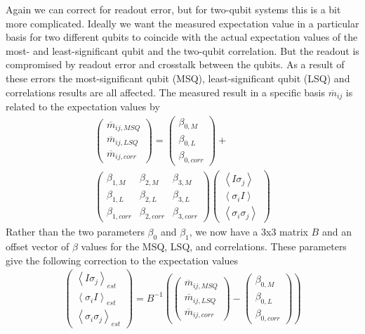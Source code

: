 Again we can correct for readout error, but for two-qubit systems this is a bit
more complicated. Ideally we want the measured expectation value in a particular
basis for two different qubits to coincide with the actual expectation values of
the most- and least-significant qubit and the two-qubit correlation. But the
readout is compromised by readout error and crosstalk between the qubits. As a
result of these errors the most-significant qubit (MSQ), least-significant qubit
(LSQ) and correlations results are all affected. The measured result
in a specific basis $\overline{m}_{ij}$ is related to the expectation values by
\begin{equation}
\label{beta}
\begin{split}
\begin{pmatrix} \overline{m}_{ij,MSQ} \\ \overline{m}_{ij,LSQ} \\
\overline{m}_{ij,corr}
\end{pmatrix}=\begin{pmatrix} \beta_{0,M} \\ \beta_{0,L} \\ \beta_{0,corr}
\end{pmatrix}+\\\begin{pmatrix} \beta_{1,M}&\beta_{2,M}&\beta_{3,M} \\
\beta_{1,L}&\beta_{2,L}&\beta_{3,L} \\
\beta_{1,corr}&\beta_{2,corr}&\beta_{3,corr}
\end{pmatrix}\begin{pmatrix} \left\langle I\sigma_j\right\rangle \\ \left\langle
\sigma_iI\right\rangle \\ \left\langle \sigma_i\sigma_j\right\rangle
\end{pmatrix}
\end{split}
\end{equation}
Rather than the two parameters $\beta_0$ and $\beta_1$, we now have a 3x3
matrix $B$ and an offset vector of $\beta$ values for the MSQ, LSQ, and
correlations. 
\newpage
These parameters give the following correction to the expectation values
\begin{equation}
\begin{split}
\begin{pmatrix} \left\langle I\sigma_j\right\rangle_{est} \\ \left\langle
\sigma_iI\right\rangle_{est} \\ \left\langle \sigma_i\sigma_j\right\rangle_{est}
\end{pmatrix}=B^{-1}\left(\begin{pmatrix} \overline{m}_{ij,MSQ} \\
\overline{m}_{ij,LSQ} \\ \overline{m}_{ij,corr}
\end{pmatrix}-\begin{pmatrix} \beta_{0,M} \\ \beta_{0,L} \\ \beta_{0,corr}
\end{pmatrix}\right)
\end{split}
\end{equation}
